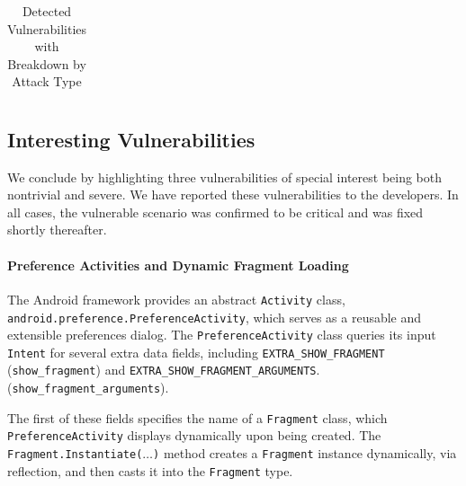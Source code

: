 \begin{table}
\begin{scriptsize}
\begin{center}
\begin{tabular}{l|c|c|c|c|c|c|c|c|c|c}
\end{tabular}
\end{center}
\end{scriptsize}
\caption{\label{Ta:vulns}Detected Vulnerabilities with Breakdown by Attack Type}
\end{table}

\subsection{Interesting Vulnerabilities}\label{Se:caseStudies}

We conclude by highlighting three vulnerabilities of special interest being both nontrivial and severe. We have reported these vulnerabilities to the developers. In all cases, the vulnerable scenario was confirmed to be critical and was fixed shortly thereafter.

\paragraph{Preference Activities and Dynamic Fragment Loading}\label{Se:PreferenceActivities}

The Android framework provides an abstract {\tt Activity} class,\texttt{
android.preference.PreferenceActivity}, which serves as a reusable and extensible preferences dialog. 
The {\tt PreferenceActivity} class queries its input {\tt Intent} for several extra data fields, including \texttt{EXTRA\_SHOW\_FRAGMENT}
(\texttt{show\_fragment}) 
and \texttt{EXTRA\_SHOW\_FRAGMENT\_ARGUMENTS}.
(\texttt{show\_fragment\_arguments}).

The first of these fields specifies the name 
of a \texttt{Fragment} class, which \texttt{PreferenceActivity}
displays dynamically upon being created. The {\tt Fragment.Instantiate($\ldots$)} method creates a {\tt Fragment} instance dynamically, via reflection, and then
casts it into the {\tt Fragment} type.

